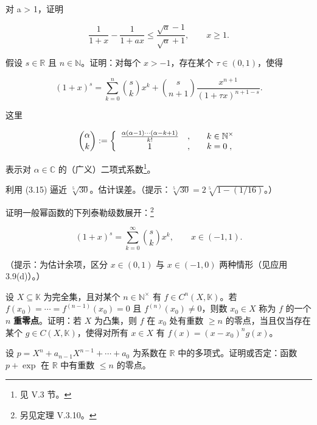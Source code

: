 \begin{exercises}
对 a > 1，证明

\[
\frac{1}{1+x}-\frac{1}{1+ax}\leq\frac{\sqrt{a}-1}{\sqrt{a}+1},\qquad x\geq1.
\]
\item[7.]

假设 $ s \in \mathbb{R} $ 且 $ n \in \mathbb{N} $。证明：对每个 $ x > -1 $，存在某个 $ \tau \in (0,1) $，使得

\begin{equation}
(1+x)^{s}=\sum_{k=0}^{n}\binom{s}{k}x^{k}+\binom{s}{n+1}\frac{x^{n+1}}{(1+\tau x)^{n+1-s}}.
\end{equation}

这里

\begin{equation*}
\binom{\alpha}{k}:=\left\{\begin{array}{c ll}{\frac{\alpha(\alpha-1)\cdots(\alpha-k+1)}{k!}}&{,\quad}&{k\in\mathbb{N}^{\times}}\\ {1}&{,\quad}&{k=0\;,}\\ \end{array}\right.
\end{equation*}

表示对 $ \alpha \in \mathbb{C} $ 的（广义）二项式系数\footnote{见 V.3 节。}。

\item[8.]

利用 (3.15) 逼近 $ \sqrt[5]{30} $。估计误差。（提示：$ \sqrt[5]{30} = 2\sqrt[5]{1 - (1/16)} $。）

\item[9.]

证明一般幂函数的下列泰勒级数展开：\footnote{另见定理 V.3.10。}

\[
(1+x)^{s}=\sum_{k=0}^{\infty}\binom{s}{k}x^{k},\qquad x\in(-1,1).
\]

（提示：为估计余项，区分 $ x \in (0,1) $ 与 $ x \in (-1,0) $ 两种情形（见应用 3.9(d)）。）

\item[10.]

设 $ X \subseteq \mathbb{K} $ 为完全集，且对某个 $ n \in \mathbb{N}^\times $ 有 $ f \in C^n(X, \mathbb{K}) $。若 $ f(x_0) = \cdots = f^{(n-1)}(x_0) = 0 $ 且 $ f^{(n)}(x_0) \neq 0 $，则数 $ x_0 \in X $ 称为 $ f $ 的一个 $ n $ \textbf{重零点}。证明：若 $ X $ 为凸集，则 $ f $ 在 $ x_0 $ 处有重数 $ \geq n $ 的零点，当且仅当存在某个 $ g \in C(X, \mathbb{K}) $，使得对所有 $ x \in X $ 有 $ f(x) = (x - x_0)^n g(x) $。

\item[11.]

设 $ p = X^n + a_{n-1}X^{n-1} + \cdots + a_0 $ 为系数在 $ \mathbb{R} $ 中的多项式。证明或否定：函数 $ p + \exp $ 在 $ \mathbb{R} $ 中有重数 $ \leq n $ 的零点。


\end{exercises}
